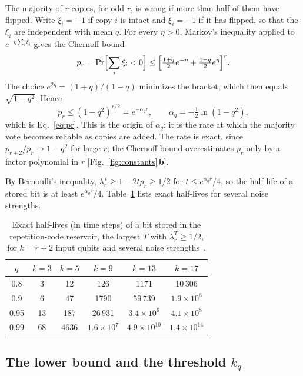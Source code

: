 \documentclass[aps,pra,reprint,superscriptaddress,floatfix]{revtex4-2}
\theoremstyle{plain}
\newcommand{\pnl}[1]{\textsf{\textbf{#1}}}
\begin{document}
The majority of $r$ copies, for odd $r$, is wrong if more than half of them have flipped. Write $\xi_i=+1$ if copy $i$ is intact and $\xi_i=-1$ if it has flipped, so that the $\xi_i$ are independent with mean $q$. For every $\eta>0$, Markov's inequality applied to $e^{-\eta\sum_i\xi_i}$ gives the Chernoff bound
\begin{equation}
p_r=\Pr\Bigl[\sum_i\xi_i<0\Bigr]\le\Bigl[\tfrac{1+q}2e^{-\eta}+\tfrac{1-q}2e^{\eta}\Bigr]^r.
\end{equation}
The choice $e^{2\eta}=(1+q)/(1-q)$ minimizes the bracket, which then equals $\sqrt{1-q^2}$. Hence
\begin{equation}
p_r\le(1-q^2)^{r/2}=e^{-\alpha_qr},\qquad\alpha_q=-\tfrac12\ln(1-q^2),
\label{eq:A-chernoff}
\end{equation}
which is Eq.~\eqref{eq:pr}. This is the origin of $\alpha_q$: it is the rate at which the majority vote becomes reliable as copies are added. The rate is exact, since $p_{r+2}/p_r\to1-q^2$ for large $r$; the Chernoff bound overestimates $p_r$ only by a factor polynomial in $r$ [Fig.~\ref{fig:constants}\,\pnl{b}].

By Bernoulli's inequality, $\lambda_r^{\,t}\ge1-2tp_r\ge1/2$ for $t\le e^{\alpha_qr}/4$, so the half-life of a stored bit is at least $e^{\alpha_qr}/4$. Table~\ref{tab:halflife} lists exact half-lives for several noise strengths.

\begin{table}[b]
\caption{Exact half-lives (in time steps) of a bit stored in the repetition-code reservoir, the largest $T$ with $\lambda_r^T\ge1/2$, for $k=r+2$ input qubits and several noise strengths~\cite{SM}.}
\label{tab:halflife}
\begin{ruledtabular}
\begin{tabular}{cccccc}
$q$ & $k=3$ & $k=5$ & $k=9$ & $k=13$ & $k=17$ \\ \hline
0.8 & 3 & 12 & 126 & 1171 & 10\,306 \\
0.9 & 6 & 47 & 1790 & 59\,739 & $1.9\times10^{6}$ \\
0.95 & 13 & 187 & 26\,931 & $3.4\times10^{6}$ & $4.1\times10^{8}$ \\
0.99 & 68 & 4636 & $1.6\times10^{7}$ & $4.9\times10^{10}$ & $1.4\times10^{14}$ \\
\end{tabular}
\end{ruledtabular}
\end{table}

\subsection{The lower bound and the threshold \texorpdfstring{$k_q$}{k q}}
\label{app:lowerbound}
\end{document}
